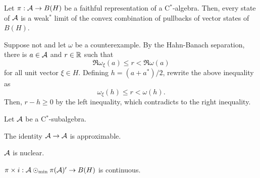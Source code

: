 \documentclass{../../../small}
\begin{document}
\begin{lem}
Let $\pi:\mathcal{A}\to B(H)$ be a faithful representation of a C$^*$-algebra.
Then, every state of $\mathcal{A}$ is a weak$^*$ limit of the convex combination of pullbacks of vector states of $B(H)$.
\end{lem}
\begin{pf}
Suppose not and let $\omega$ be a counterexample.
By the Hahn-Banach separation, there is $a\in\mathcal{A}$ and $r\in\mathbb{R}$ such that
\[\Re\omega_\xi(a)\le r<\Re\omega(a)\]
for all unit vector $\xi\in H$.
Defining $h=(a+a^*)/2$, rewrite the above inequality as
\[\omega_\xi(h)\le r<\omega(h).\]
Then, $r-h\ge0$ by the left inequality, which contradicts to the right inequality.
\end{pf}

\begin{thm}
Let $\mathcal{A}$ be a C$^*$-subalgebra.
\begin{parts}
\item The identity $\mathcal{A}\to\mathcal{A}$ is approximable.
\item $\mathcal{A}$ is nuclear.
\item $\pi\times i:\mathcal{A}\odot_{\min}\pi(\mathcal{A})'\to B(H)$ is continuous.
\end{parts}
\end{thm}
\end{document}
